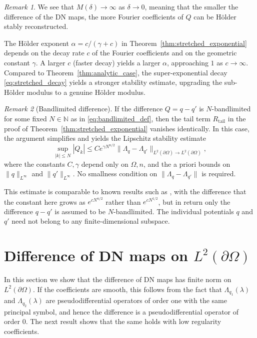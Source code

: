 \documentclass[a4paper, 11pt, twoside, notitlepage]{amsart}
\theoremstyle{definition}
\theoremstyle{remark}
\newtheorem{remark}{Remark}[section]
\newcommand {\p} {\partial}
\begin{document}
\begin{remark}We see that $M(\delta) \to \infty$ as $\delta \to 0$, meaning that the smaller the difference of the DN maps, the more Fourier coefficients of $Q$ can be H\"older stably reconstructed. 

The H\"older exponent $\alpha = c/(\gamma + c)$ in Theorem~\ref{thm:stretched_exponential} depends on the decay rate $c$ of the Fourier coefficients and on the geometric constant $\gamma$. A larger $c$ (faster decay) yields a larger $\alpha$, approaching $1$ as $c \to \infty$. Compared to Theorem~\ref{thm:analytic_case}, the super-exponential decay \eqref{eq:stretched_decay}  yields a stronger stability estimate, upgrading the sub-H\"older modulus to a genuine H\"older modulus.
\end{remark}

\begin{remark}[Bandlimited difference]
If the difference $Q = q - q'$ is $N$-bandlimited for some fixed $N \in \mathbb{N}$ as in \eqref{eq:bandlimited_def}, then the tail term $R_{\text{tail}}$ in the proof of Theorem~\ref{thm:stretched_exponential} vanishes identically. In this case, the argument simplifies and yields the Lipschitz stability estimate
\[
\sup_{|k| \leq N} |Q_k| \leq C e^{\gamma N^{n/2}} \|\Lambda_q - \Lambda_{q'}\|_{L^2(\partial\Omega) \to L^2(\partial\Omega)},
\]
where the constants $C, \gamma$ depend only on $\Omega, n$, and the a priori bounds on $\|q\|_{L^\infty}$ and $\|q'\|_{L^\infty}$. No smallness condition on $\|\Lambda_q - \Lambda_{q'}\|$ is required.

This estimate is comparable to known results such as \cite[Theorem~2]{alberti2022calderon}, with the difference that the constant here grows as $e^{cN^{n/2}}$ rather than $e^{cN^{1/2}}$, but in return only the difference $q-q'$ is assumed to be $N$-bandlimited. The individual potentials $q$ and $q'$ need not belong to any finite-dimensional subspace.
\end{remark}




\appendix 




\section{Difference of DN maps on $L^2(\p \Omega)$} \label{sec_difference_dn_maps}

In this section we show that the difference of DN maps has finite norm on $L^2(\p \Omega)$. If the coefficients are smooth, this follows from the fact that $\Lambda_{q_1}(\lambda)$ and $\Lambda_{q_2}(\lambda)$ are pseudodifferential operators of order one with the same principal symbol, and hence the difference is a pseudodifferential operator of order $0$. The next result shows that the same holds with low regularity coefficients.
\end{document}
